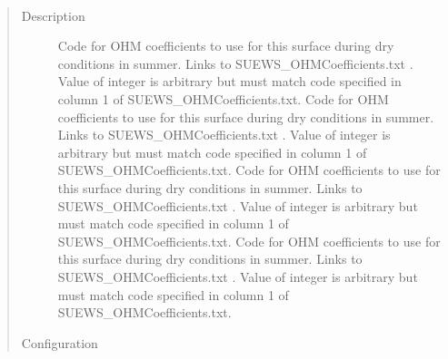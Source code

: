 \documentclass[letterpaper,10pt,english]{sphinxmanual}
\begin{document}
\begin{fulllineitems}
\label{\detokenize{input_files/SUEWS_SiteInfo/Input_Options:cmdoption-arg-ohmcode-summerdry}}~\begin{quote}\begin{description}
\item[{Description}] \leavevmode
Code for OHM coefficients to use for this surface during dry conditions in summer. Links to SUEWS\_OHMCoefficients.txt . Value of integer is arbitrary but must match code specified in column 1 of SUEWS\_OHMCoefficients.txt.  Code for OHM coefficients to use for this surface during dry conditions in summer. Links to SUEWS\_OHMCoefficients.txt . Value of integer is arbitrary but must match code specified in column 1 of SUEWS\_OHMCoefficients.txt.  Code for OHM coefficients to use for this surface during dry conditions in summer. Links to SUEWS\_OHMCoefficients.txt . Value of integer is arbitrary but must match code specified in column 1 of SUEWS\_OHMCoefficients.txt.  Code for OHM coefficients to use for this surface during dry conditions in summer. Links to SUEWS\_OHMCoefficients.txt . Value of integer is arbitrary but must match code specified in column 1 of SUEWS\_OHMCoefficients.txt.

\item[{Configuration}] \leavevmode


\end{description}
\end{quote}
\end{fulllineitems}
\end{document}
